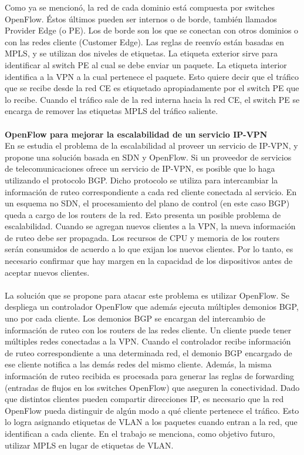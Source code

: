 Como ya se mencionó, la red de cada dominio está compuesta por switches OpenFlow. Éstos últimos pueden ser internos o de borde, también llamados Provider Edge (o PE). Los de borde son los que se conectan con otros dominios o con las redes cliente (Customer Edge). Las reglas de reenvío están basadas en MPLS, y se utilizan dos niveles de etiquetas. La etiqueta exterior sirve para identificar al switch PE al cual se debe enviar un paquete. La etiqueta interior identifica a la VPN a la cual pertenece el paquete. Esto quiere decir que el tráfico que se recibe desde la red CE es etiquetado apropiadamente por el switch PE que lo recibe. Cuando el tráfico sale de la red interna hacia la red CE, el switch PE se encarga de remover las etiquetas MPLS del tráfico saliente. \\ \\
\textbf{OpenFlow para mejorar la escalabilidad de un servicio IP-VPN} \\
En \cite{ip-vpn-bgp-sdn} se estudia el problema de la escalabilidad al proveer un servicio de IP-VPN, y propone una solución basada en SDN y OpenFlow. Si un proveedor de servicios de telecomunicaciones ofrece un servicio de IP-VPN, es posible que lo haga utilizando el protocolo BGP. Dicho protocolo se utiliza para intercambiar la información de ruteo correspondiente a cada red cliente conectada al servicio. En un esquema no SDN, el procesamiento del plano de control (en este caso BGP) queda a cargo de los routers de la red. Esto presenta un posible problema de escalabilidad. Cuando se agregan nuevos clientes a la VPN, la nueva información de ruteo debe ser propagada. Los recursos de CPU y memoria de los routers serán consumidos de acuerdo a lo que exijan los nuevos clientes. Por lo tanto, es necesario confirmar que hay margen en la capacidad de los dispositivos antes de aceptar nuevos clientes. \\ \\
La solución que se propone para atacar este problema es utilizar OpenFlow. Se despliega un controlador OpenFlow que además ejecuta múltiples demonios BGP, uno por cada cliente. Los demonios BGP se encargan del intercambio de información de ruteo con los routers de las redes cliente. Un cliente puede tener múltiples redes conectadas a la VPN. Cuando el controlador recibe información de ruteo correspondiente a una determinada red, el demonio BGP encargado de ese cliente notifica a las demás redes del mismo cliente. Además, la misma información de ruteo recibida es procesada para generar las reglas de forwarding (entradas de flujos en los switches OpenFlow) que aseguren la conectividad. Dado que distintos clientes pueden compartir direcciones IP, es necesario que la red OpenFlow pueda distinguir de algún modo a qué cliente pertenece el tráfico. Esto lo logra asignando etiquetas de VLAN a los paquetes cuando entran a la red, que identifican a cada cliente. En el trabajo se menciona, como objetivo futuro, utilizar MPLS en lugar de etiquetas de VLAN. \\ \\
